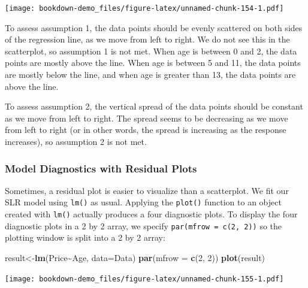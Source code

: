 \documentclass[
]{book}
\newenvironment{Shaded}{\begin{snugshade}}{\end{snugshade}}
\newcommand{\AttributeTok}[1]{\textcolor[rgb]{0.13,0.29,0.53}{#1}}
\newcommand{\DecValTok}[1]{\textcolor[rgb]{0.00,0.00,0.81}{#1}}
\newcommand{\FunctionTok}[1]{\textcolor[rgb]{0.13,0.29,0.53}{\textbf{#1}}}
\newcommand{\NormalTok}[1]{#1}
\newcommand{\OtherTok}[1]{\textcolor[rgb]{0.56,0.35,0.01}{#1}}
\newcommand{\SpecialCharTok}[1]{\textcolor[rgb]{0.81,0.36,0.00}{\textbf{#1}}}
\begin{document}
\texttt{[image: bookdown-demo\_files/figure-latex/unnamed-chunk-154-1.pdf]}

To assess assumption 1, the data points should be evenly scattered on both sides of the regression line, as we move from left to right. We do not see this in the scatterplot, so assumption 1 is not met. When age is between 0 and 2, the data points are mostly above the line. When age is between 5 and 11, the data points are mostly below the line, and when age is greater than 13, the data points are above the line.

To assess assumption 2, the vertical spread of the data points should be constant as we move from left to right. The spread seems to be decreasing as we move from left to right (or in other words, the spread is increasing as the response increases), so assumption 2 is not met.

\hypertarget{model-diagnostics-with-residual-plots}{%
\subsubsection*{Model Diagnostics with Residual Plots}\label{model-diagnostics-with-residual-plots}}

Sometimes, a residual plot is easier to visualize than a scatterplot. We fit our SLR model using \texttt{lm()} as usual. Applying the \texttt{plot()} function to an object created with \texttt{lm()} actually produces a four diagnostic plots. To display the four diagnostic plots in a 2 by 2 array, we specify \texttt{par(mfrow\ =\ c(2,\ 2))} so the plotting window is split into a 2 by 2 array:

\begin{Shaded}
\begin{Highlighting}[]
\NormalTok{result}\OtherTok{\textless{}{-}}\FunctionTok{lm}\NormalTok{(Price}\SpecialCharTok{\textasciitilde{}}\NormalTok{Age, }\AttributeTok{data=}\NormalTok{Data)}
\FunctionTok{par}\NormalTok{(}\AttributeTok{mfrow =} \FunctionTok{c}\NormalTok{(}\DecValTok{2}\NormalTok{, }\DecValTok{2}\NormalTok{))}
\FunctionTok{plot}\NormalTok{(result)}
\end{Highlighting}
\end{Shaded}

\texttt{[image: bookdown-demo\_files/figure-latex/unnamed-chunk-155-1.pdf]}
\end{document}
